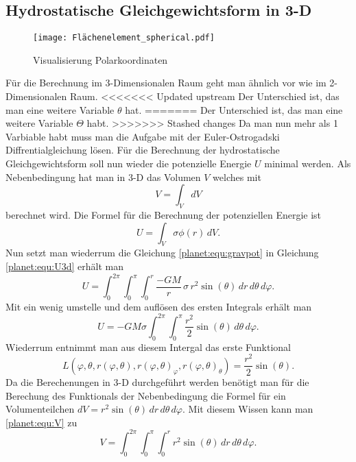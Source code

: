 \subsection{Hydrostatische Gleichgewichtsform in 3-D}
\begin{figure}
	\centering
	\texttt{[image: Flächenelement\_spherical.pdf]}
	\caption{Visualisierung Polarkoordinaten}
\end{figure}
Für die Berechnung im 3-Dimensionalen Raum geht man ähnlich vor wie im 2-Dimensionalen Raum.
<<<<<<< Updated upstream
Der Unterschied ist, das man eine weitere Variable \(\theta\) hat.
=======
Der Unterschied ist, das man eine weitere Variable \(\Theta\) habt.
>>>>>>> Stashed changes
Da man nun mehr als 1 Varbiable habt muss man die Aufgabe mit der Euler-Ostrogadski Diffrentialgleichung lösen.
Für die Berechnung der hydrostatische Gleichgewichtsform soll nun wieder die potenzielle Energie \(U\) minimal werden.
Als Nebenbedingung hat man in 3-D das Volumen \(V\) welches mit 
\begin{equation}
	V = \int_{V}^{} dV
	\label{planet:equ:V}
\end{equation}
berechnet wird.
Die Formel für die Berechnung der potenziellen Energie ist
\begin{equation}
	U = \int_{V} \sigma  \phi (r)\, dV.
	\label{planet:equ:U3d}
\end{equation}
Nun setzt man wiederrum die Gleichung \ref{planet:equ:gravpot} in Gleichung \ref{planet:equ:U3d} erhält man
\begin{equation*}
	U = \int_{0}^{2\pi}\int_{0}^{\pi}\int_{0}^{r} \frac{-GM}{r}\, \sigma\, r^2 \sin (\theta) \, dr \, d\theta \, d\varphi.
\end{equation*}
Mit ein wenig umstelle und dem auflösen des ersten Integrals erhält man
\begin{equation*}
	U =-GM\sigma \int_{0}^{2\pi}\int_{0}^{\pi}\frac{r^2}{2}  \sin (\theta) \, d\theta \, d\varphi.
\end{equation*}
Wiederrum entnimmt man aus diesem Intergal das erste Funktional
\begin{equation*}
	L(\varphi,\theta ,r(\varphi,\theta),r(\varphi,\theta)_\varphi,r(\varphi,\theta)_\theta) = \frac{r^2}{2}  \sin (\theta).
\end{equation*}
Da die Berechenungen in 3-D durchgeführt werden benötigt man für die Berechung des Funktionals der Nebenbedingung die Formel für ein Volumenteilchen \(dV = r^2 \sin (\theta) \, dr \, d\theta \, d\varphi \).
Mit diesem Wissen kann man \ref{planet:equ:V} zu
\begin{equation*}
	V = \int_{0}^{2\pi}\int_{0}^{\pi}\int_{0}^{r} r^2 \sin (\theta) \, dr \, d\theta \, d\varphi.
\end{equation*}
